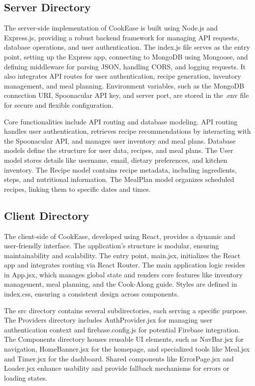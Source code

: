 \documentclass[10pt,twocolumn]{article}
\begin{document}
\subsection{Server Directory}
The server-side implementation of CookEase is built using Node.js and Express.js, providing a robust backend framework for managing API requests, database operations, and user authentication. The index.js file serves as the entry point, setting up the Express app, connecting to MongoDB using Mongoose, and defining middleware for parsing JSON, handling CORS, and logging requests. It also integrates API routes for user authentication, recipe generation, inventory management, and meal planning. Environment variables, such as the MongoDB connection URI, Spoonacular API key, and server port, are stored in the .env file for secure and flexible configuration.

Core functionalities include API routing and database modeling. API routing handles user authentication, retrieves recipe recommendations by interacting with the Spoonacular API, and manages user inventory and meal plans. Database models define the structure for user data, recipes, and meal plans. The User model stores details like username, email, dietary preferences, and kitchen inventory. The Recipe model contains recipe metadata, including ingredients, steps, and nutritional information. The MealPlan model organizes scheduled recipes, linking them to specific dates and times.

\subsection{Client Directory}
The client-side of CookEase, developed using React, provides a dynamic and user-friendly interface. The application's structure is modular, ensuring maintainability and scalability. The entry point, main.jsx, initializes the React app and integrates routing via React Router. The main application logic resides in App.jsx, which manages global state and renders core features like inventory management, meal planning, and the Cook-Along guide. Styles are defined in index.css, ensuring a consistent design across components.

The src directory contains several subdirectories, each serving a specific purpose. The Providers directory includes AuthProvider.jsx for managing user authentication context and firebase.config.js for potential Firebase integration. The Components directory houses reusable UI elements, such as NavBar.jsx for navigation, HomeBanner.jsx for the homepage, and specialized tools like Meal.jsx and Timer.jsx for the dashboard. Shared components like ErrorPage.jsx and Loader.jsx enhance usability and provide fallback mechanisms for errors or loading states.
\end{document}
